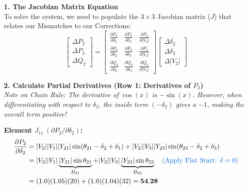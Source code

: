 \documentclass[11pt]{article}
\begin{document}
\begin{stepbox}

\textbf{1. The Jacobian Matrix Equation}\\
To solve the system, we need to populate the $3 \times 3$ Jacobian matrix ($J$) that relates our Mismatches to our Corrections:
\begin{equation*}
    \begin{bmatrix} \Delta P_2 \\ \Delta P_3 \\ \Delta Q_2 \end{bmatrix} = 
    \begin{bmatrix} 
    \frac{\partial P_2}{\partial \delta_2} & \frac{\partial P_2}{\partial \delta_3} & \frac{\partial P_2}{\partial |V_2|} \\[0.3cm]
    \frac{\partial P_3}{\partial \delta_2} & \frac{\partial P_3}{\partial \delta_3} & \frac{\partial P_3}{\partial |V_2|} \\[0.3cm]
    \frac{\partial Q_2}{\partial \delta_2} & \frac{\partial Q_2}{\partial \delta_3} & \frac{\partial Q_2}{\partial |V_2|} 
    \end{bmatrix}
    \begin{bmatrix} \Delta \delta_2 \\ \Delta \delta_3 \\ \Delta |V_2| \end{bmatrix}
\end{equation*}

\vspace{0.3cm}
\textbf{2. Calculate Partial Derivatives (Row 1: Derivatives of $P_2$)}\\
\textit{Note on Chain Rule: The derivative of $\cos(x)$ is $-\sin(x)$. However, when differentiating with respect to $\delta_2$, the inside term $(-\delta_2)$ gives a $-1$, making the overall term positive!}

\noindent \textbf{Element $J_{11} \ (\partial P_2 / \partial \delta_2)$:}
\begin{align*}
    \frac{\partial P_2}{\partial \delta_2} &= |V_2||V_1||Y_{21}|\sin(\theta_{21} - \delta_2 + \delta_1) + |V_2||V_3||Y_{23}|\sin(\theta_{23} - \delta_2 + \delta_3) \\
    &= |V_2||V_1|\underbrace{|Y_{21}|\sin\theta_{21}}_{B_{21}} + |V_2||V_3|\underbrace{|Y_{23}|\sin\theta_{23}}_{B_{23}} \quad \text{\textcolor{mainblue}{(Apply Flat Start: $\delta=0$)}} \\
    &= (1.0)(1.05)(20) + (1.0)(1.04)(32) = \mathbf{54.28}
\end{align*}


\end{stepbox}
\end{document}

